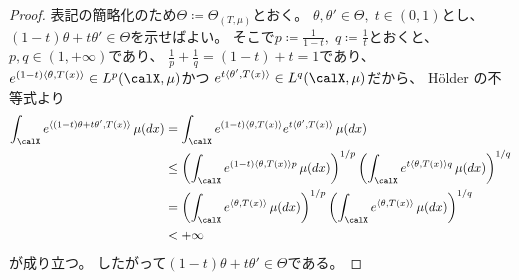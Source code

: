 \documentclass[report]{jlreq}
\begin{document}
\begin{proof}
    表記の簡略化のため$\Theta \coloneqq \Theta_{(T, \mu)}$とおく。
    $\theta, \theta' \in \Theta, \; t \in (0, 1)$とし、
    $(1 - t) \theta + t \theta' \in \Theta$を示せばよい。
    そこで$p \coloneqq \frac{1}{1 - t}, \; q \coloneqq \frac{1}{t}$とおくと、
    $p, q \in (1, +\infty)$であり、
    $\frac{1}{p} + \frac{1}{q} = (1 - t) + t = 1$であり、
    $e^{(1 - t)\langle \theta, T(x) \rangle} \in L^p(\calX, \mu)$かつ
    $e^{t \langle \theta', T(x) \rangle} \in L^q(\calX, \mu)$だから、
    H\"older の不等式より
    \begin{alignat}{1}
        \int_\calX e^{\langle (1 - t) \theta + t \theta', T(x) \rangle} \, \mu(dx)
            &= \int_\calX
                e^{(1 - t) \langle \theta, T(x) \rangle}
                e^{t \langle \theta', T(x) \rangle}
                \, \mu(dx) \\
            &\le \myparen{
                \int_\calX
                e^{(1 - t) \langle \theta, T(x) \rangle p}
                \, \mu(dx)
            }^{1 / p}
            \myparen{
                \int_\calX
                e^{t \langle \theta, T(x) \rangle q}
                \, \mu(dx)
            }^{1 / q} \\
            &= \myparen{
                \int_\calX
                e^{\langle \theta, T(x) \rangle}
                \, \mu(dx)
            }^{1 / p}
            \myparen{
                \int_\calX
                e^{\langle \theta, T(x) \rangle}
                \, \mu(dx)
            }^{1 / q} \\
            &< +\infty
    \end{alignat}
    が成り立つ。
    したがって$(1 - t) \theta + t \theta' \in \Theta$である。
\end{proof}
\end{document}
